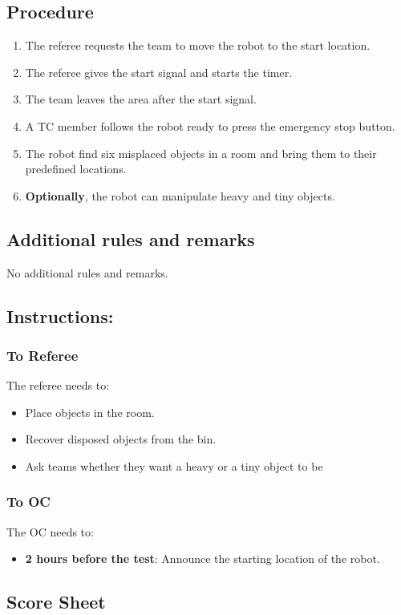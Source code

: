 \subsection*{Procedure}

\begin{enumerate}
	\item The referee requests the team to move the robot to the start location.
	\item The referee gives the start signal and starts the timer.
	\item The team leaves the area after the start signal.
	\item A TC member follows the robot ready to press the emergency stop button.
	\item The robot find six misplaced objects in a room and bring them to their predefined locations.
	\item \textbf{Optionally}, the robot can manipulate heavy and tiny objects.
\end{enumerate}

\subsection*{Additional rules and remarks}
	No additional rules and remarks.

\subsection*{Instructions:}

\subsubsection*{To Referee}

The referee needs to:
\begin{itemize}
	\item Place objects in the room.
	\item Recover disposed objects from the bin.
	\item Ask teams whether they want a heavy or a tiny object to be 
\end{itemize}

\subsubsection*{To OC}
The OC needs to:
\begin{itemize}[nosep]
	\item \textbf{2 hours before the test}: Announce the starting location of the robot.
\end{itemize}

\subsection*{Score Sheet}

